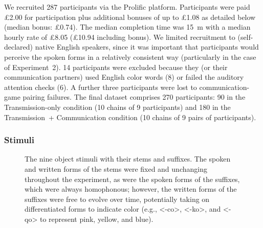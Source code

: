 \documentclass[doc,biblatex]{apa7}
\begin{document}
We recruited 287 participants via the Prolific platform. Participants were paid £2.00 for participation plus additional bonuses of up to £1.08 as detailed below (median bonus: £0.74). The median completion time was 15~m with a median hourly rate of £8.05 (£10.94 including bonus). We limited recruitment to (self-declared) native English speakers, since it was important that participants would perceive the spoken forms in a relatively consistent way (particularly in the case of Experiment~2). 14 participants were excluded because they (or their communication partners) used English color words (8) or failed the auditory attention checks (6). A further three participants were lost to communication-game pairing failures. The final dataset comprises 270 participants: 90 in the Transmission-only condition (10 chains of 9 participants) and 180 in the Transmission~+ Communication condition (10 chains of 9 pairs of participants).

\subsubsection{Stimuli}

	\begin{figure}
	\vspace*{2pt}
	\caption{The nine object stimuli with their stems and suffixes. The spoken and written forms of the stems were fixed and unchanging throughout the experiment, as were the spoken forms of the suffixes, which were always homophonous; however, the written forms of the suffixes were free to evolve over time, potentially taking on differentiated forms to indicate color (e.g., <-co>, <-ko>, and <-qo> to represent pink, yellow, and blue).}
	\label{stimuli}
	\end{figure}
\end{document}
